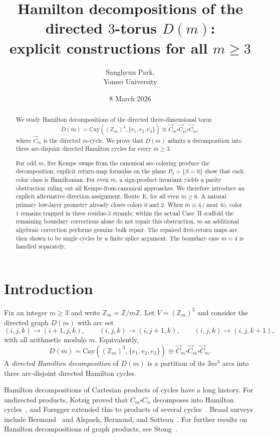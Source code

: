 \documentclass[11pt]{article}
\title{Hamilton decompositions of the directed $3$-torus $D(m)$:\\
explicit constructions for all $m\ge 3$}
\author{Sanghyun Park, \\ Yonsei University}
\date{8 March 2026}
\begin{document}
\maketitle

\begin{abstract}
We study Hamilton decompositions of the directed three-dimensional torus
\[
D(m)=\mathrm{Cay}((\mathbb Z_m)^3,\{e_1,e_2,e_3\})\cong \vec C_m\square \vec C_m\square \vec C_m,
\]
where $\vec C_m$ is the directed $m$-cycle.
We prove that $D(m)$ admits a decomposition into three arc-disjoint directed Hamilton cycles for every $m\ge 3$.

For odd $m$, five Kempe swaps from the canonical arc-coloring produce the decomposition;
explicit return-map formulas on the plane $P_0=\{S=0\}$ show that each color class is Hamiltonian.
For even $m$, a sign-product invariant yields a parity obstruction ruling out all Kempe-from-canonical approaches.
We therefore introduce an explicit alternative direction assignment, Route~E, for all even $m\ge 6$.
A natural primary low-layer geometry already closes colors $0$ and $2$.
When $m\equiv 4\pmod 6$, color $1$ remains trapped in three residue-$3$ strands;
within the actual Case~II scaffold the remaining boundary corrections alone do not repair this obstruction, so an additional algebraic correction performs genuine bulk repair.
The repaired first-return maps are then shown to be single cycles by a finite splice argument.
The boundary case $m=4$ is handled separately.
\end{abstract}


\section{Introduction}

Fix an integer $m\ge 3$ and write $\mathbb Z_m=\mathbb Z/m\mathbb Z$.
Let $V=(\mathbb Z_m)^3$ and consider the directed graph $D(m)$ with arc set
\[
(i,j,k)\to(i+1,j,k),\qquad (i,j,k)\to(i,j+1,k),\qquad (i,j,k)\to(i,j,k+1),
\]
with all arithmetic modulo $m$.
Equivalently,
\[
D(m)=\mathrm{Cay}((\mathbb Z_m)^3,\{e_1,e_2,e_3\})\cong \vec C_m\square \vec C_m\square \vec C_m.
\]
A \emph{directed Hamilton decomposition} of $D(m)$ is a partition of its $3m^3$ arcs into three arc-disjoint directed Hamilton cycles.

Hamilton decompositions of Cartesian products of cycles have a long history.
For undirected products, Kotzig proved that $C_m\square C_n$ decomposes into Hamilton cycles~\cite{Kotzig1973}, and Foregger extended this to products of several cycles~\cite{Foregger1978}.
Broad surveys include Bermond~\cite{Bermond1978} and Alspach, Bermond, and Sotteau~\cite{AlspachBermondSotteau1990}.
For further results on Hamilton decompositions of graph products, see Stong~\cite{Stong1991}.
\end{document}
